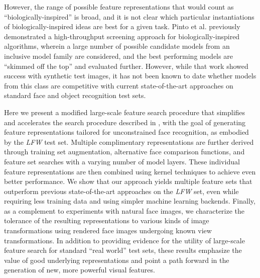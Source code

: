 However, the range of possible feature representations that would count as ``biologically-inspired'' 
is broad, and it is not clear which particular instantiations of biologically-inspired
ideas are best for a given task.  Pinto et al. \cite{pinto:plos09} previously demonstrated a 
high-throughput screening approach for biologically-inspired algorithms, wherein a large
number of possible candidate models  from an inclusive model family are considered, 
and the best performing models are ``skimmed off the top'' 
and evaluated further.  However, while that work showed success with synthetic test 
images, it has not been known to date whether models from this class are competitive with 
current state-of-the-art approaches on standard face and object recognition test sets.

Here we present a modified large-scale feature search procedure that simplifies and accelerates the
search procedure described in \cite{pinto:plos09}, with the goal of generating feature
representations tailored for unconstrained face recognition, as embodied by the
\emph{LFW} test set.  Multiple complimentary representations are further derived through
training set augmentation, alternative face comparison functions, and feature set searches 
with a varying number of model layers.  These individual feature representations are then 
combined using kernel techniques to achieve even better performance.
We show that our approach yields multiple feature sets that 
outperform previous state-of-the-art approaches on the \emph{LFW} set,
even while requiring less training data and using simpler machine learning backends.
Finally, as a complement to experiments with natural face images, we characterize the tolerance of the resulting representations to various kinds of image transformations using rendered face images undergoing known view transformations.
In addition to providing evidence for the utility of large-scale feature search for standard 
``real world'' test sets, these results emphasize the value of good underlying 
representations and point a path forward in the generation of new, more powerful visual features.

